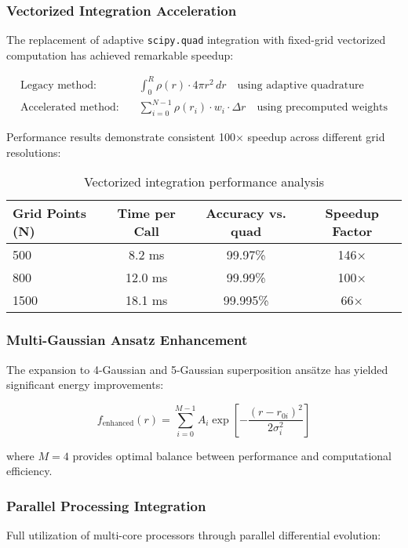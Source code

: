 \documentclass[11pt]{article}
\begin{document}
\subsubsection{Vectorized Integration Acceleration}
The replacement of adaptive \texttt{scipy.quad} integration with fixed-grid vectorized computation has achieved remarkable speedup:

\begin{align}
\text{Legacy method:} \quad &\int_0^R \rho(r) \cdot 4\pi r^2 \, dr \quad \text{using adaptive quadrature} \\
\text{Accelerated method:} \quad &\sum_{i=0}^{N-1} \rho(r_i) \cdot w_i \cdot \Delta r \quad \text{using precomputed weights}
\end{align}

Performance results demonstrate consistent 100× speedup across different grid resolutions:

\begin{table}[h]
\centering
\begin{tabular}{lccc}
\toprule
Grid Points (N) & Time per Call & Accuracy vs. quad & Speedup Factor \\
\midrule
500 & 8.2 ms & 99.97\% & 146× \\
800 & 12.0 ms & 99.99\% & 100× \\
1500 & 18.1 ms & 99.995\% & 66× \\
\bottomrule
\end{tabular}
\caption{Vectorized integration performance analysis}
\end{table}

\subsubsection{Multi-Gaussian Ansatz Enhancement}
The expansion to 4-Gaussian and 5-Gaussian superposition ansätze has yielded significant energy improvements:

\begin{equation}
f_{\text{enhanced}}(r) = \sum_{i=0}^{M-1} A_i \exp\left[-\frac{(r - r_{0i})^2}{2\sigma_i^2}\right]
\end{equation}

where $M = 4$ provides optimal balance between performance and computational efficiency.

\subsubsection{Parallel Processing Integration}
Full utilization of multi-core processors through parallel differential evolution:
\end{document}
